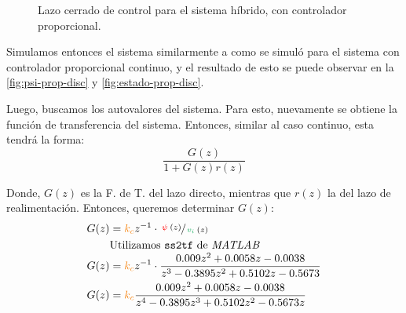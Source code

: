 \begin{figure}[h]
  \caption{Lazo cerrado de control para el sistema híbrido, con controlador proporcional.}\label{fig:control-prop-hibrido}
\end{figure}

Simulamos entonces el sistema similarmente a como se simuló para el sistema con
controlador proporcional continuo, y el resultado de esto se puede observar en
la \autoref{fig:psi-prop-disc} y \autoref{fig:estado-prop-disc}.

Luego, buscamos los autovalores del sistema. Para esto, nuevamente se obtiene la
función de transferencia del sistema. Entonces, similar al caso continuo, esta
tendrá la forma:
\begin{equation}
  \frac{G(z)}{1 + G(z)r(z)}
\end{equation}

Donde, $G(z)$ es la F. de T. del lazo directo, mientras que $r(z)$ la del lazo
de realimentación. Entonces, queremos determinar $G(z)$:
\begin{align}
  G(z) &= \nara{k_{c}}z^{-1} \cdot \sfrac{\rojo{\psi}(z)}{\verd{v_{i}}(z)} \\
  &\text{Utilizamos \texttt{ss2tf} de \textit{MATLAB}} \\
  G(z) &= \nara{k_{c}}z^{-1} \cdot \frac{0.009z^{2} + 0.0058z - 0.0038}{z^{3} - 0.3895z^{2} + 0.5102z - 0.5673} \\
  G(z) &= \nara{k_{c}}\frac{0.009z^{2} + 0.0058z - 0.0038}{z^{4} - 0.3895z^{3} + 0.5102z^{2} - 0.5673z}
\end{align}

